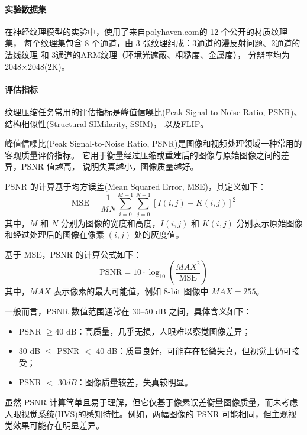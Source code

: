 \paragraph{实验数据集}

在神经纹理模型的实验中，使用了来自polyhaven.com\cite{PolyHaven}的 12 个公开的材质纹理集，
每个纹理集包含 8 个通道，由 3 张纹理组成：3通道的漫反射问题、2通道的法线纹理 和 3通道的ARM纹理（环境光遮蔽、粗糙度、金属度），
分辨率均为2048×2048(2K)。

\paragraph{评估指标}

纹理压缩任务常用的评估指标是峰值信噪比(Peak Signal-to-Noise Ratio, PSNR)、
结构相似性(Structural SIMilarity, SSIM)\cite{wang2004image}，
以及FLIP\cite{andersson2020flip}。

峰值信噪比(Peak Signal-to-Noise Ratio, PSNR)是图像和视频处理领域一种常用的客观质量评价指标。
它用于衡量经过压缩或重建后的图像与原始图像之间的差异，PSNR 值越高，
说明失真越小，图像质量越好。

PSNR 的计算基于均方误差(Mean Squared Error, MSE)，其定义如下：
\begin{equation}
\text{MSE} = \frac{1}{MN} \sum_{i=0}^{M-1} \sum_{j=0}^{N-1} \left[ I(i,j) - K(i,j) \right]^2
\end{equation}
其中，$M$ 和 $N$ 分别为图像的宽度和高度，$I(i,j)$ 和 $K(i,j)$ 分别表示原始图像和经过处理后的图像在像素 $(i,j)$ 处的灰度值。

基于 MSE，PSNR 的计算公式如下：
\begin{equation}
    \text{PSNR} = 10 \cdot \log_{10} \left( \frac{MAX^2}{\text{MSE}} \right)
\end{equation}
其中，$MAX$ 表示像素的最大可能值，例如 8-bit 图像中 $MAX = 255$。

一般而言，PSNR 数值范围通常在 30–50 dB 之间，具体含义如下：
\begin{itemize}
    \item PSNR $\geq 40$ dB：高质量，几乎无损，人眼难以察觉图像差异；
    \item 30 dB $\leq$ PSNR $<$ 40 dB：质量良好，可能存在轻微失真，但视觉上仍可接受；
    \item PSNR $<$ 30$ dB$：图像质量较差，失真较明显。
\end{itemize}

虽然 PSNR 计算简单且易于理解，但它仅基于像素误差衡量图像质量，而未考虑人眼视觉系统(HVS)的感知特性。例如，两幅图像的 PSNR 可能相同，但主观视觉效果可能存在明显差异。

